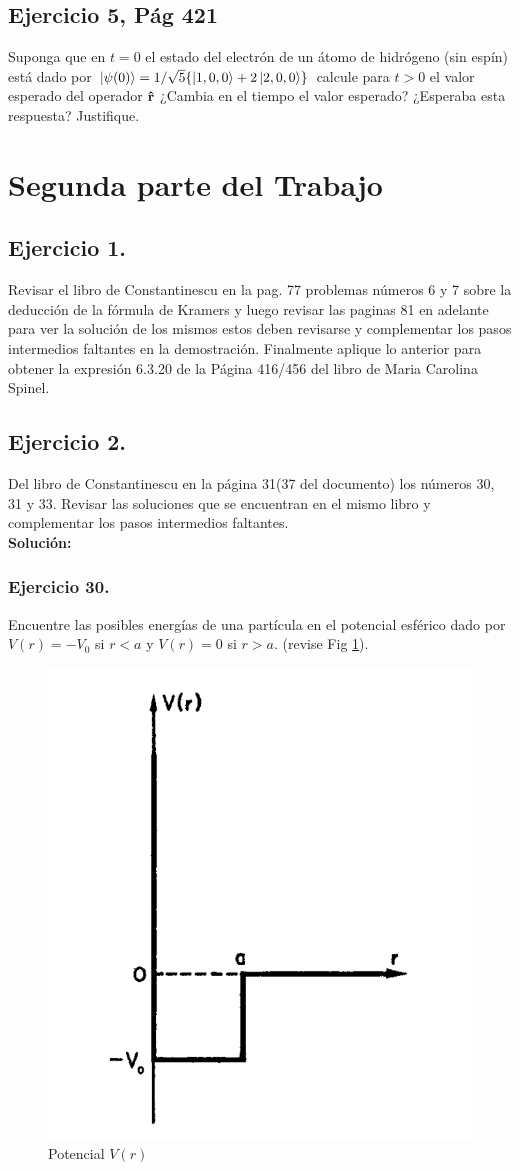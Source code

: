 \documentclass[
course = {{Mecánica Cuántica II}}
]{aga-homework}
\begin{document}
\subsection*{Ejercicio 5, Pág 421}
Suponga que en $t=0$ el estado del electrón de un átomo de hidrógeno (sin espín) está dado por $\ket{\psi(0)}=1/\sqrt{5}\qty{\ket{1,0,0} + 2\ket{2,0,0}}$ calcule para $t>0$ el valor esperado del operador $\vu{r}$ ¿Cambia en el tiempo el valor esperado? ¿Esperaba esta respuesta? Justifique.

\section*{Segunda parte del Trabajo}
\subsection*{Ejercicio 1.}
Revisar el libro de Constantinescu en la pag. 77 problemas números 6 y 7 sobre la deducción de la fórmula de Kramers y luego revisar las paginas 81 en adelante para ver la solución de los mismos estos deben revisarse y complementar los pasos intermedios faltantes en la demostración. Finalmente aplique lo anterior para obtener la expresión 6.3.20 de la Página 416/456 del libro de Maria Carolina Spinel.

\subsection*{Ejercicio 2.}
Del libro de Constantinescu en la página 31(37 del documento) los  números 30,  31 y 33. Revisar las soluciones que se encuentran en el mismo libro y complementar los pasos intermedios faltantes.\\

\textbf{Solución:} 

\subsubsection*{Ejercicio 30.}
Encuentre las posibles energías de una partícula en el potencial esférico dado por $V(r) = -V_0$ si $r<a$ y $V(r)=0$ si $r>a$. (revise Fig \ref{fig:luis_img0}).

\begin{figure}
    \centering
    \includegraphics[width=0.3\columnwidth]{img/luis_img0}
    \caption{Potencial $V(r)$}
    \label{fig:luis_img0}
\end{figure}
\end{document}
